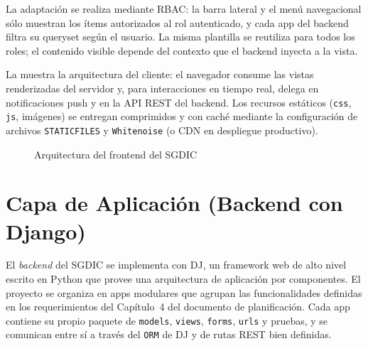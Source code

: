 La adaptación se realiza mediante \ac{RBAC}: la barra lateral y el menú
navegacional sólo muestran los ítems autorizados al rol autenticado, y
cada app del backend filtra su queryset según el usuario. La misma
plantilla se reutiliza para todos los roles; el contenido visible depende
del contexto que el backend inyecta a la vista.

La  muestra la arquitectura del cliente: el navegador
consume las vistas renderizadas del servidor y, para interacciones en
tiempo real, delega en notificaciones push y en la API REST del
backend. Los recursos estáticos (\texttt{css}, \texttt{js}, imágenes) se
entregan comprimidos y con caché mediante la configuración de archivos
\texttt{STATICFILES} y \texttt{Whitenoise} (o CDN en despliegue productivo).
\begin{figure}[H]
\centering
{}%
\caption{Arquitectura del frontend del \ac{SGDIC}}
\label{fig:frontend}
\end{figure}

\section{Capa de Aplicación (Backend con Django)}
\label{sec:backend}

El \textit{backend} del \ac{SGDIC} se implementa con \ac{DJ}, un framework
web de alto nivel escrito en Python que provee una arquitectura
de aplicación por componentes. El proyecto se organiza en apps modulares que
agrupan las funcionalidades definidas en los requerimientos del Capítulo~4
del documento de planificación. Cada app contiene su propio paquete de
\texttt{models}, \texttt{views}, \texttt{forms}, \texttt{urls} y pruebas,
y se comunican entre sí a través del \texttt{ORM} de \ac{DJ} y de rutas
\ac{REST} bien definidas.

